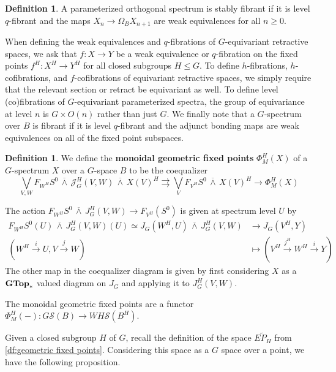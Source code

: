 \documentclass[11pt]{amsart}
\newcommand{\sJ}{\mathscr{J}}
\newcommand{\cS}{\mathcal{S}}
\newcommand{\cat}[1]{\textup{\textbf{{#1}}}}
\newcommand{\GTop}{\cat{GTop}}
\newcommand{\barsmash}{\,\overline\wedge\,}
\theoremstyle{plain}   %
\theoremstyle{definition}
\newtheorem{df}[thm]{Definition}
\theoremstyle{remark}
\numberwithin{equation}{section}
\begin{document}
\begin{df}
A parameterized orthogonal spectrum is stably fibrant if it is level $q$-fibrant and the maps $X_n \to \Omega_B X_{n+1}$ are weak equivalences for all $n\geq 0$. 
\end{df}

When defining the weak equivalences and $q$-fibrations of $G$-equivariant retractive spaces, we ask that $f:X\to Y$ be a weak equivalence or $q$-fibration on the fixed points $f^H:X^H\to Y^H$ for all closed subgroups $H\leq G$. To define $h$-fibrations, $h$-cofibrations, and $f$-cofibrations of equivariant retractive spaces, we simply require that the relevant section or retract be equivariant as well. To define level (co)fibrations of $G$-equivariant parameterized spectra, the group of equivariance at level $n$ is $G\times O(n)$ rather than just $G$. We finally note that a $G$-spectrum over $B$ is fibrant if it is level $q$-fibrant and the adjunct bonding maps are weak equivalences on all of the fixed point subspaces. 

\begin{df}
We define the \textbf{monoidal geometric fixed points} $\Phi^H_M(X)$ of a $G$-spectrum $X$ over a $G$-space $B$ to be the coequalizer  
\begin{equation}
\bigvee_{V,W} F_{W^H}S^0 \barsmash \sJ_G^H(V,W) \barsmash X(V)^H \rightrightarrows \bigvee_V F_{V^H}S^0 \barsmash X(V)^H \rightarrow \Phi_M^H(X)
\end{equation}

The action $F_{W^H}S^0 \barsmash J_G^H(V,W)\to F_{V^H}(S^0)$ is given at spectrum level $U$ by
\begin{align*}
F_{W^H}S^0(U) \barsmash J_G^H(V,W)(U) \simeq J_G(W^H,U)\barsmash J_G^H(V,W)  & \to J_G(V^H,Y)\\
(W^H\xrightarrow{i} U,V\xrightarrow{j} W)&\mapsto (V^H\xrightarrow{j^H} W^H\xrightarrow{i} Y)
\end{align*}
The other map in the coequalizer diagram is given by first considering $X$ as a $\GTop_*$ valued diagram on $J_G$ and applying it to $J_G^H(V,W)$. 
\end{df}

The monoidal geometric fixed points are a functor $\Phi_M^H(-):G\cS(B)\to WH\cS(B^H)$. 

Given a closed subgroup $H$ of $G$, recall the definition of the space $\widetilde{EP_H}$ from \cref{df:geometric fixed points}. Considering this space as a $G$ space over a point, we have the following proposition.
\end{document}
